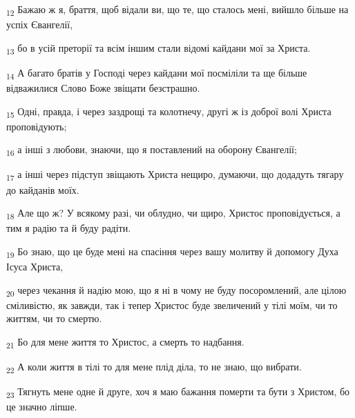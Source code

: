 \begin{tcolorbox}
\textsubscript{12} Бажаю ж я, браття, щоб відали ви, що те, що сталось мені, вийшло більше на успіх Євангелії,
\end{tcolorbox}
\begin{tcolorbox}
\textsubscript{13} бо в усій преторії та всім іншим стали відомі кайдани мої за Христа.
\end{tcolorbox}
\begin{tcolorbox}
\textsubscript{14} А багато братів у Господі через кайдани мої посміліли та ще більше відважилися Слово Боже звіщати безстрашно.
\end{tcolorbox}
\begin{tcolorbox}
\textsubscript{15} Одні, правда, і через заздрощі та колотнечу, другі ж із доброї волі Христа проповідують;
\end{tcolorbox}
\begin{tcolorbox}
\textsubscript{16} а інші з любови, знаючи, що я поставлений на оборону Євангелії;
\end{tcolorbox}
\begin{tcolorbox}
\textsubscript{17} а інші через підступ звіщають Христа нещиро, думаючи, що додадуть тягару до кайданів моїх.
\end{tcolorbox}
\begin{tcolorbox}
\textsubscript{18} Але що ж? У всякому разі, чи облудно, чи щиро, Христос проповідується, а тим я радію та й буду радіти.
\end{tcolorbox}
\begin{tcolorbox}
\textsubscript{19} Бо знаю, що це буде мені на спасіння через вашу молитву й допомогу Духа Ісуса Христа,
\end{tcolorbox}
\begin{tcolorbox}
\textsubscript{20} через чекання й надію мою, що я ні в чому не буду посоромлений, але цілою сміливістю, як завжди, так і тепер Христос буде звеличений у тілі моїм, чи то життям, чи то смертю.
\end{tcolorbox}
\begin{tcolorbox}
\textsubscript{21} Бо для мене життя то Христос, а смерть то надбання.
\end{tcolorbox}
\begin{tcolorbox}
\textsubscript{22} А коли життя в тілі то для мене плід діла, то не знаю, що вибрати.
\end{tcolorbox}
\begin{tcolorbox}
\textsubscript{23} Тягнуть мене одне й друге, хоч я маю бажання померти та бути з Христом, бо це значно ліпше.
\end{tcolorbox}
